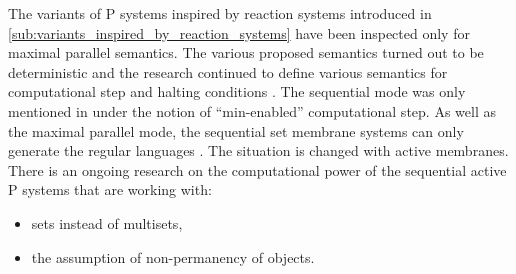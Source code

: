 The variants of P systems inspired by reaction systems introduced in \ref{sub:variants_inspired_by_reaction_systems} have been inspected only for maximal parallel semantics. The various proposed semantics turned out to be deterministic and the research continued to define various semantics for computational step \cite{Kleijn11SetMembrane} and halting conditions \cite{Paun12BridgingReactionSystems}. The sequential mode was only mentioned in \cite{Kleijn11SetMembrane} under the notion of ``min-enabled'' computational step. As well as the maximal parallel mode, the sequential set membrane systems can only generate the regular languages \cite{Alhazov05WithoutMultiplicities}. The situation is changed with active membranes. There is an ongoing research on the computational power of the sequential active P systems that are working with:
\begin{itemize}
   \item sets instead of multisets,
   \item the assumption of non-permanency of objects.
 \end{itemize}